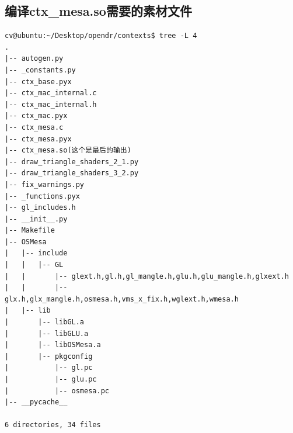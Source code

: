 \documentclass{article}
\begin{document}
\begin{appendices}
\section{编译ctx\_mesa.so需要的素材文件}
\begin{lstlisting} 
cv@ubuntu:~/Desktop/opendr/contexts$ tree -L 4
.
|-- autogen.py
|-- _constants.py
|-- ctx_base.pyx
|-- ctx_mac_internal.c
|-- ctx_mac_internal.h
|-- ctx_mac.pyx
|-- ctx_mesa.c
|-- ctx_mesa.pyx
|-- ctx_mesa.so(这个是最后的输出)
|-- draw_triangle_shaders_2_1.py
|-- draw_triangle_shaders_3_2.py
|-- fix_warnings.py
|-- _functions.pyx
|-- gl_includes.h
|-- __init__.py
|-- Makefile
|-- OSMesa
|   |-- include
|   |   |-- GL
|   |       |-- glext.h,gl.h,gl_mangle.h,glu.h,glu_mangle.h,glxext.h
|   |       |-- glx.h,glx_mangle.h,osmesa.h,vms_x_fix.h,wglext.h,wmesa.h
|   |-- lib
|       |-- libGL.a
|       |-- libGLU.a
|       |-- libOSMesa.a
|       |-- pkgconfig
|           |-- gl.pc
|           |-- glu.pc
|           |-- osmesa.pc
|-- __pycache__

6 directories, 34 files
\end{lstlisting}


\end{appendices}
\end{document}
